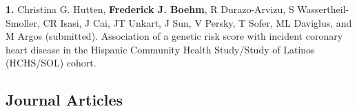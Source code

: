 \documentclass[
  10pt,
]
{article}
\begin{document}
\textbf{1.} \normalsize \normalsize Christina G. Hutten\normalsize ,
\textbf{\normalsize Frederick J. Boehm}\normalsize , \normalsize R
Durazo-Arvizu\normalsize , \normalsize S
Wassertheil-Smoller\normalsize , \normalsize CR Isasi\normalsize ,
\normalsize J Cai\normalsize , \normalsize JT Unkart\normalsize ,
\normalsize J Sun\normalsize , \normalsize V Persky\normalsize ,
\normalsize T Sofer\normalsize , \normalsize ML Daviglus\normalsize ,
and \normalsize M Argos (submitted). Association of a genetic risk score
with incident coronary heart disease in the Hispanic Community Health
Study/Study of Latinos (HCHS/SOL) cohort.

\subsection{Journal Articles}\label{journal-articles}
\end{document}
